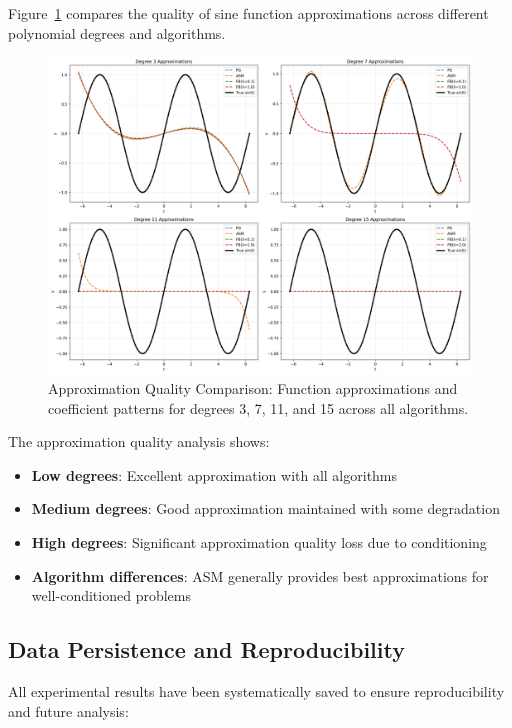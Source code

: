 \documentclass[11pt,a4paper]{article}
\begin{document}
Figure~\ref{fig:task2_approximations} compares the quality of sine function approximations across different polynomial degrees and algorithms.

\begin{figure}[h]
\centering
\includegraphics[width=\textwidth]{../results/plots/task2_approximation_comparison.png}
\caption{Approximation Quality Comparison: Function approximations and coefficient patterns for degrees 3, 7, 11, and 15 across all algorithms.}
\label{fig:task2_approximations}
\end{figure}

The approximation quality analysis shows:
\begin{itemize}
    \item \textbf{Low degrees}: Excellent approximation with all algorithms
    \item \textbf{Medium degrees}: Good approximation maintained with some degradation
    \item \textbf{High degrees}: Significant approximation quality loss due to conditioning
    \item \textbf{Algorithm differences}: ASM generally provides best approximations for well-conditioned problems
\end{itemize}

\subsection{Data Persistence and Reproducibility}

All experimental results have been systematically saved to ensure reproducibility and future analysis:
\end{document}
